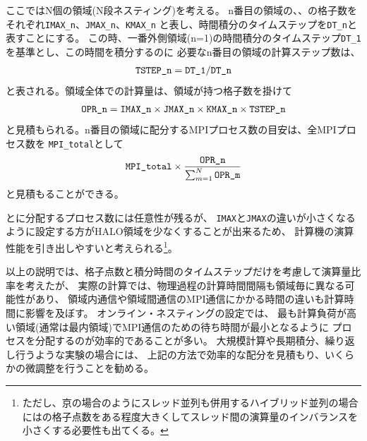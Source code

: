 ここではN個の領域(N段ネスティング)を考える。
n番目の領域の{\XDIR}、{\YDIR}、{\ZDIR}の格子数をそれぞれ\verb|IMAX_n|、\verb|JMAX_n|、\verb|KMAX_n|
と表し、時間積分のタイムステップを\verb|DT_n|と表すことにする。
この時、一番外側領域(n=1)の時間積分のタイムステップ\verb|DT_1|を基準とし、この時間を積分するのに
必要なn番目の領域の計算ステップ数は、
\begin{eqnarray}
 \verb|TSTEP_n| = \verb|DT_1| / \verb|DT_n|  \nonumber
\end{eqnarray}
と表される。領域全体での計算量は、領域が持つ格子数を掛けて
\begin{eqnarray}
 \verb|OPR_n| = \verb|IMAX_n| \times \verb|JMAX_n| \times \verb|KMAX_n| \times \verb|TSTEP_n| \nonumber
\end{eqnarray}
と見積もられる。n番目の領域に配分するMPIプロセス数の目安は、全MPIプロセス数を \verb|MPI_total|として
\begin{eqnarray}
 \verb|MPI_total| \times \frac{ \texttt{OPR\_n} }{ \sum_{m=1}^N \texttt{OPR\_m} }
\end{eqnarray}
と見積もることができる。


{\XDIR} と{\YDIR}に分配するプロセス数には任意性が残るが、
\verb|IMAX|と\verb|JMAX|の違いが小さくなるように設定する方がHALO領域を少なくすることが出来るため、
計算機の演算性能を引き出しやすいと考えられる\footnote{ただし、京の場合のようにスレッド並列も併用するハイブリッド並列の場合には{\YDIR}の格子点数をある程度大きくしてスレッド間の演算量のインバランスを小さくする必要性も出てくる。}。


以上の説明では、格子点数と積分時間のタイムステップだけを考慮して演算量比率を考えたが、
実際の計算では、物理過程の計算時間間隔も領域毎に異なる可能性があり、
領域内通信や領域間通信のMPI通信にかかる時間の違いも計算時間に影響を及ぼす。
オンライン・ネスティングの設定では、
最も計算負荷が高い領域(通常は最内領域)でMPI通信のための待ち時間が最小となるように
プロセスを分配するのが効率的であることが多い。
大規模計算や長期積分、繰り返し行うような実験の場合には、
上記の方法で効率的な配分を見積もり、いくらかの微調整を行うことを勧める。



